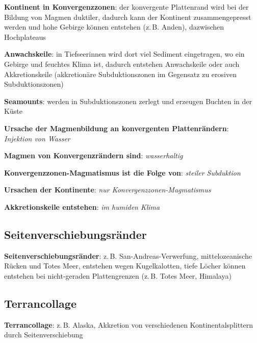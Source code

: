 \textbf{Kontinent in Konvergenzzonen}:
der konvergente Plattenrand wird bei der Bildung von Magmen duktiler,
dadurch kann der Kontinent zusammengepresst werden und hohe Gebirge können entstehen
(z.\,B. Anden), dazwischen Hochplateaus

\textbf{Anwachskeile}:
in Tiefseerinnen wird dort viel Sediment eingetragen, wo ein Gebirge und feuchtes Klima ist,
dadurch entstehen Anwachskeile oder auch Akkretionskeile
(akkretionäre Subduktionszonen im Gegensatz zu erosiven Subduktionszonen)

\textbf{Seamounts}:
werden in Subduktionszonen zerlegt und erzeugen Buchten in der Küste

\begin{wichtig}
    \item
    \textbf{Ursache der Magmenbildung an konvergenten Plattenrändern}:\\
    \emph{Injektion von Wasser}

    \item
    \textbf{Magmen von Konvergenzrändern sind}:
    \emph{wasserhaltig}

    \item
    \textbf{Konvergenzzonen-Magmatismus ist die Folge von}:
    \emph{steiler Subduktion}

    \item
    \textbf{Ursachen der Kontinente}:
    \emph{nur Konvergenzzonen-Magmatismus}

    \item
    \textbf{Akkretionskeile entstehen}:
    \emph{im humiden Klima}
\end{wichtig}

\subsection{%
    Seitenverschiebungsränder%
}

\textbf{Seitenverschiebungsränder}:
z.\,B. San-Andreas-Verwerfung, mittelozeanische Rücken und Totes Meer,
entstehen wegen Kugelkalotten,
tiefe Löcher können entstehen bei nicht-geraden Plattengrenzen
(z.\,B. Totes Meer, Himalaya)

\subsection{%
    Terrancollage%
}

\textbf{Terrancollage}:
z.\,B. Alaska,
Akkretion von verschiedenen Kontinentalsplittern durch Seitenverschiebung

